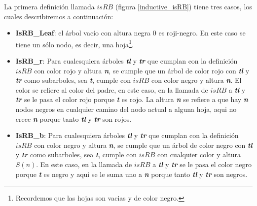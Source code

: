 La primera definici\'on llamada \hyperref[inductive_isRB]{$isRB$} (figura \ref{inductive_isRB}) 
tiene tres casos, los cuales describiremos a continuaci\'on:
\begin{itemize}
        \item \textbf{IsRB\_Leaf}: el árbol vacío con altura negra 0 es roji-negro. En este caso
        se tiene un s\'olo nodo, es decir, una hoja\footnote{Recordemos que las hojas son vacias y de
        color negro.}.
        \item \textbf{IsRB\_r}: Para cualesquiera \'arboles \textbf{\textit{tl}} y 
        \textbf{\textit{tr}} que cumplan con la definici\'on \hyperref[inductive_isRB]{$isRB$} con 
        color rojo y altura \textbf{\textit{n}}, se cumple que un \'arbol de color rojo con 
        \textbf{\textit{tl}} y \textbf{\textit{tr}} como subarboles, sea \textbf{\textit{t}}, cumple 
        con \hyperref[inductive_isRB]{$isRB$} con color negro y altura \textbf{\textit{n}}. El color 
        se refiere al color del padre, en este caso, en la llamada de 
        \hyperref[inductive_isRB]{$isRB$} a \textbf{\textit{tl}} y \textbf{\textit{tr}} se le pasa 
        el color rojo porque \textbf{\textit{t}} es rojo. La altura \textbf{\textit{n}} se refiere a 
        que hay \textbf{\textit{n}} nodos negros en cualquier camino del nodo actual a alguna hoja, 
        aqui no crece \textbf{\textit{n}} porque tanto
        \textbf{\textit{tl}} y \textbf{\textit{tr}} son rojos.
        \item \textbf{IsRB\_b}: Para cualesquiera \'arboles \textbf{\textit{tl}} y 
        \textbf{\textit{tr}} que cumplan con la definici\'on \hyperref[inductive_isRB]{$isRB$} con 
        color negro y altura \textbf{\textit{n}}, se cumple que un \'arbol de color negro con 
        \textbf{\textit{tl}} y \textbf{\textit{tr}} como subarboles, sea \textbf{\textit{t}}, cumple 
        con \hyperref[inductive_isRB]{$isRB$} con cualquier color y altura $S(n)$. En este caso, en 
        la llamada de \hyperref[inductive_isRB]{$isRB$} a \textbf{\textit{tl}} y 
        \textbf{\textit{tr}} se le pasa el color negro porque \textbf{\textit{t}} es negro y aqui se 
        le suma uno a \textbf{\textit{n}} porque tanto \textbf{\textit{tl}} y \textbf{\textit{tr}} 
        son negros.
\end{itemize}


